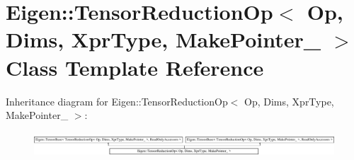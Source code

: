 \hypertarget{class_eigen_1_1_tensor_reduction_op}{}\section{Eigen\+:\+:Tensor\+Reduction\+Op$<$ Op, Dims, Xpr\+Type, Make\+Pointer\+\_\+ $>$ Class Template Reference}
\label{class_eigen_1_1_tensor_reduction_op}
Inheritance diagram for Eigen\+:\+:Tensor\+Reduction\+Op$<$ Op, Dims, Xpr\+Type, Make\+Pointer\+\_\+ $>$\+:\begin{figure}[H]
\begin{center}
\leavevmode
\includegraphics[height=0.921053cm]{class_eigen_1_1_tensor_reduction_op}
\end{center}
\end{figure}
